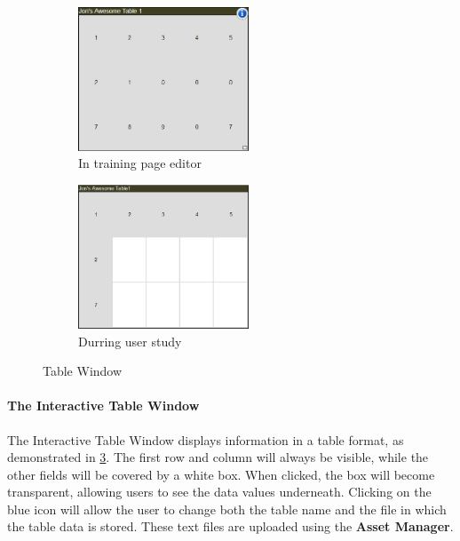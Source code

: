 \documentclass[article]{ij4uq}              %
\begin{document}
\begin{figure}[h!]
 \centering
 \begin{subfigure}[b]{0.4\textwidth}
    \centering
    \includegraphics[width=2.0in]{figures/table_uncovered.png}
    \caption{In training page editor}
    \label{fig:tableUN}
 \end{subfigure}
 \begin{subfigure}[b]{0.4\textwidth}
    \centering
    \includegraphics[width=2.0in]{figures/table_covered.png}
    \caption{Durring user study}
    \label{fig:tableCV}
 \end{subfigure}
 \caption{Table Window}
 \label{fig:tableWindow}
\end{figure}

\FloatBarrier

\paragraph{The Interactive Table Window}

The Interactive Table Window displays information in a table format, as demonstrated in \ref{fig:tableWindow}.  The first row and column will always be visible, while the other fields will be covered by a white box.  When clicked, the box will become transparent, allowing users to see the data values underneath.  Clicking on the blue icon will allow the user to change both the table name and the file in which the table data is stored. These text files are uploaded using the \textbf{Asset Manager}.  
\end{document}
